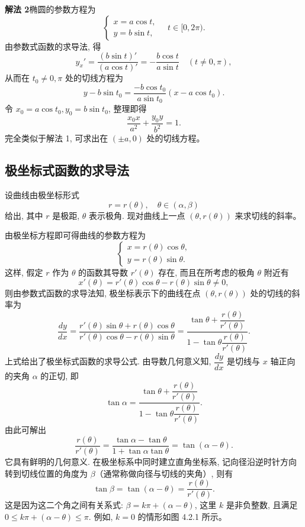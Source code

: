 \documentclass[UTF8, 12pt, fontset=fandol, oneside]{ctexart}
\begin{document}
\noindent\textbf{解法 2}\quad 椭圆的参数方程为
\[
  \begin{cases}
    x=a\cos t,\\
    y=b\sin t,
  \end{cases}
  \quad t\in[0,2\pi).
\]
由参数式函数的求导法, 得
\[
  y_x'=\frac{(b\sin t)'}{(a\cos t)'}
  =
  -\frac{b\cos t}{a\sin t}
  \quad(t\ne0,\pi),
\]
从而在 $t_0\ne0,\pi$ 处的切线方程为
\[
  y-b\sin t_0=
  \frac{-b\cos t_0}{a\sin t_0}(x-a\cos t_0).
\]
令 $x_0=a\cos t_0,y_0=b\sin t_0$, 整理即得
\[
  \frac{x_0x}{a^2}+\frac{y_0y}{b^2}=1.
\]
完全类似于解法 1, 可求出在 $(\pm a,0)$ 处的切线方程。

\subsection{极坐标式函数的求导法}

设曲线由极坐标形式
\[
  r=r(\theta),\quad \theta\in(\alpha,\beta)
\]
给出, 其中 $r$ 是极距, $\theta$ 表示极角. 现对曲线上一点 $(\theta,r(\theta))$ 来求切线的斜率。

由极坐标方程即可得曲线的参数方程为
\[
  \begin{cases}
    x=r(\theta)\cos\theta,\\
    y=r(\theta)\sin\theta.
  \end{cases}
\]
这样, 假定 $r$ 作为 $\theta$ 的函数其导数 $r'(\theta)$ 存在, 而且在所考虑的极角 $\theta$ 附近有
\[
  x'(\theta)=r'(\theta)\cos\theta-r(\theta)\sin\theta\ne0,
\]
则由参数式函数的求导法知, 极坐标表示下的曲线在点 $(\theta,r(\theta))$ 处的切线的斜率为
\[
  \frac{dy}{dx}
  =
  \frac{r'(\theta)\sin\theta+r(\theta)\cos\theta}
       {r'(\theta)\cos\theta-r(\theta)\sin\theta}
  =
  \frac{\tan\theta+\dfrac{r(\theta)}{r'(\theta)}}
       {1-\tan\theta\dfrac{r(\theta)}{r'(\theta)}}.
\]
上式给出了极坐标式函数的求导公式. 由导数几何意义知, $\dfrac{dy}{dx}$ 是切线与 $x$ 轴正向的夹角 $\alpha$ 的正切, 即
\[
  \tan\alpha=
  \frac{\tan\theta+\dfrac{r(\theta)}{r'(\theta)}}
       {1-\tan\theta\dfrac{r(\theta)}{r'(\theta)}}.
\]
由此可解出
\[
  \frac{r(\theta)}{r'(\theta)}
  =
  \frac{\tan\alpha-\tan\theta}{1+\tan\alpha\tan\theta}
  =
  \tan(\alpha-\theta).
\]
它具有鲜明的几何意义. 在极坐标系中同时建立直角坐标系, 记向径沿逆时针方向转到切线位置的角度为 $\beta$（通常称做向径与切线的夹角）, 则有
\[
  \tan\beta=\tan(\alpha-\theta)=\frac{r(\theta)}{r'(\theta)}.
\]
这是因为这二个角之间有关系式: $\beta=k\pi+(\alpha-\theta)$, 这里 $k$ 是非负整数, 且满足 $0\leqslant k\pi+(\alpha-\theta)\leqslant\pi$. 例如, $k=0$ 的情形如图 4.2.1 所示。
\end{document}
